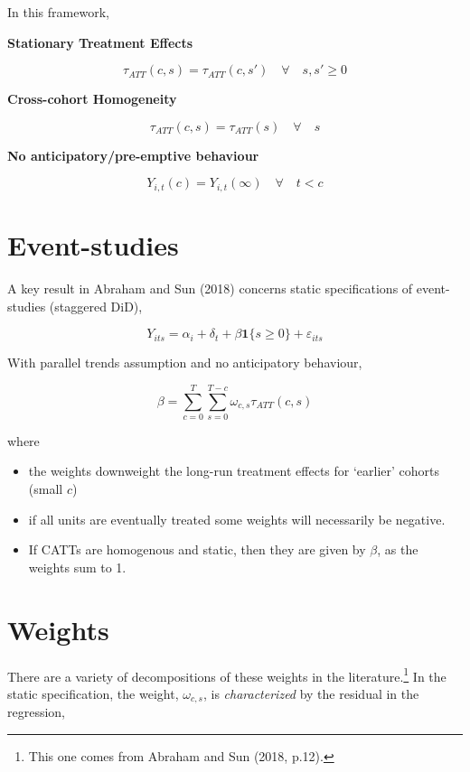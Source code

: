 \documentclass[
  letterpaper,
  DIV=11,
  numbers=noendperiod]{scrreprt}
\providecommand{\tightlist}{%
  \setlength{\itemsep}{0pt}\setlength{\parskip}{0pt}}\usepackage{longtable,booktabs,array}
\theoremstyle{definition}
\theoremstyle{remark}
\begin{document}
In this framework,

\label{stationary-treatment-effects}
\textbf{Stationary Treatment Effects}

\[
\tau_{ATT}(c,s) = \tau_{ATT}(c,s')\quad \forall\quad s,s'\geq0
\]

\label{cross-cohort-homogeneity}
\textbf{Cross-cohort Homogeneity}

\[
\tau_{ATT}(c,s) = \tau_{ATT}(s)\quad \forall\quad s
\]

\label{no-anticipatory-pre-emptive-behaviour}
\textbf{No anticipatory/pre-emptive behaviour}

\[
Y_{i,t}(c) = Y_{i,t}(\infty)\quad \forall\quad t<c
\]

\section{Event-studies}\label{event-studies}

A key result in Abraham and Sun (2018) concerns static specifications of
event-studies (staggered DiD),

\[
Y_{its} = \alpha_i + \delta_t + \beta \mathbf{1}\{s\geq 0\} + \varepsilon_{its}
\]

With parallel trends assumption and no anticipatory behaviour,

\[
\beta = \sum_{c=0}^T\sum_{s= 0}^{T-c}\omega_{c,s} \tau_{ATT}(c,s)
\]

where

\begin{itemize}
\tightlist
\item
  the weights downweight the long-run treatment effects for `earlier'
  cohorts (small \(c\))
\item
  if all units are eventually treated some weights will necessarily be
  negative.
\item
  If CATTs are homogenous and static, then they are given by \(\beta\),
  as the weights sum to 1.
\end{itemize}

\section{Weights}\label{weights}

There are a variety of decompositions of these weights in the
literature.\footnote{This one comes from Abraham and Sun (2018, p.12).}
In the static specification, the weight, \(\omega_{c,s}\), is
\emph{characterized} by the residual in the regression,
\end{document}

